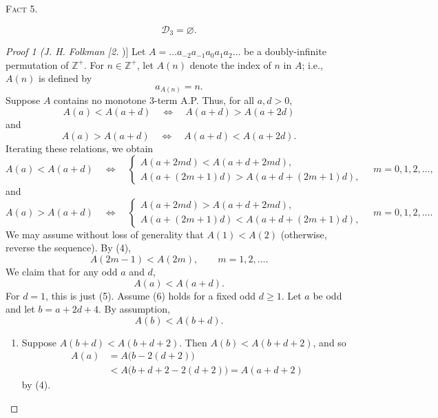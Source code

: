 \documentclass[10pt]{article}
\newcommand{\Zpos}{\mathbb{Z}^{+}}
\newcommand{\Dcal}{\mathscr{D}}
\newcommand{\fact}[1]{\par\medskip\noindent\textsc{Fact #1.}\par\smallskip}
\begin{document}
\fact{5}
\[
 \Dcal_3=\varnothing.
\]

\begin{proof}[Proof 1 (J. H. Folkman [2])]
Let $A=\ldots a_{-2}a_{-1}a_0a_1a_2\ldots$ be a doubly-infinite
permutation of $\Zpos$. For $n\in\Zpos$, let $A(n)$ denote the index of
$n$ in $A$; i.e., $A(n)$ is defined by
\[
 a_{A(n)}=n.
\]
Suppose $A$ contains no monotone 3-term A.P. Thus, for all $a,d>0$,
\[
 A(a)<A(a+d)\quad\Longleftrightarrow\quad A(a+d)>A(a+2d)
\]
and
\[
 A(a)>A(a+d)\quad\Longleftrightarrow\quad A(a+d)<A(a+2d).
\]
Iterating these relations, we obtain
\begin{equation}
 A(a)<A(a+d)\quad\Longleftrightarrow\quad
 \begin{cases}
 A(a+2md)<A(a+d+2md),\\
 A(a+(2m+1)d)>A(a+d+(2m+1)d),
 \end{cases}
 \quad m=0,1,2,\ldots,
 \tag{4}
\end{equation}
and
\begin{equation}
 A(a)>A(a+d)\quad\Longleftrightarrow\quad
 \begin{cases}
 A(a+2md)>A(a+d+2md),\\
 A(a+(2m+1)d)<A(a+d+(2m+1)d),
 \end{cases}
 \quad m=0,1,2,\ldots.
 \tag{4'}
\end{equation}
We may assume without loss of generality that $A(1)<A(2)$ (otherwise,
reverse the sequence). By (4),
\begin{equation}
 A(2m-1)<A(2m),\qquad m=1,2,\ldots.
 \tag{5}
\end{equation}
We claim that for any odd $a$ and $d$,
\begin{equation}
 A(a)<A(a+d).
 \tag{6}
\end{equation}
For $d=1$, this is just (5). Assume (6) holds for a fixed odd $d\ge1$.
Let $a$ be odd and let $b=a+2d+4$. By assumption,
\[
 A(b)<A(b+d).
\]

\begin{enumerate}[label=(\roman*),leftmargin=2.3em]
\item Suppose $A(b+d)<A(b+d+2)$. Then $A(b)<A(b+d+2)$, and so
\[
 \begin{aligned}
 A(a)&=A\bigl(b-2(d+2)\bigr)\\
     &<A\bigl(b+d+2-2(d+2)\bigr)=A(a+d+2)
 \end{aligned}
\]
by (4).


\end{enumerate}
\end{proof}
\end{document}
